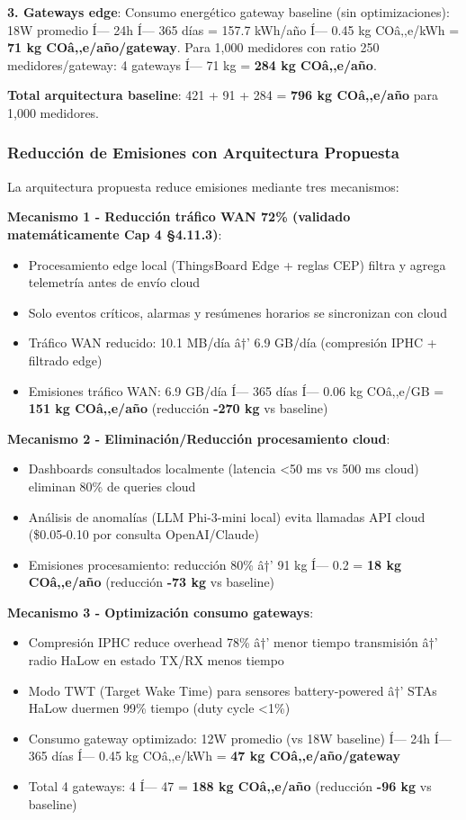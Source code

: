 \textbf{3. Gateways edge}: Consumo energético gateway baseline (sin optimizaciones): 18W promedio Í— 24h Í— 365 días = 157.7 kWh/año Í— 0.45 kg COâ‚‚e/kWh = \textbf{71 kg COâ‚‚e/año/gateway}. Para 1,000 medidores con ratio 250 medidores/gateway: 4 gateways Í— 71 kg = \textbf{284 kg COâ‚‚e/año}.

\textbf{Total arquitectura baseline}: 421 + 91 + 284 = \textbf{796 kg COâ‚‚e/año} para 1,000 medidores.

\subsubsection{Reducción de Emisiones con Arquitectura Propuesta}

La arquitectura propuesta reduce emisiones mediante tres mecanismos:

\textbf{Mecanismo 1 - Reducción tráfico WAN 72\% (validado matemáticamente Cap 4 §4.11.3)}:
\begin{itemize}
    \item Procesamiento edge local (ThingsBoard Edge + reglas CEP) filtra y agrega telemetría antes de envío cloud
    \item Solo eventos críticos, alarmas y resúmenes horarios se sincronizan con cloud
    \item Tráfico WAN reducido: 10.1 MB/día â†’ 6.9 GB/día (compresión IPHC + filtrado edge)
    \item Emisiones tráfico WAN: 6.9 GB/día Í— 365 días Í— 0.06 kg COâ‚‚e/GB = \textbf{151 kg COâ‚‚e/año} (reducción \textbf{-270 kg} vs baseline)
\end{itemize}

\textbf{Mecanismo 2 - Eliminación/Reducción procesamiento cloud}:
\begin{itemize}
    \item Dashboards consultados localmente (latencia <50 ms vs 500 ms cloud) eliminan 80\% de queries cloud
    \item Análisis de anomalías (LLM Phi-3-mini local) evita llamadas API cloud (\$0.05-0.10 por consulta OpenAI/Claude)
    \item Emisiones procesamiento: reducción 80\% â†’ 91 kg Í— 0.2 = \textbf{18 kg COâ‚‚e/año} (reducción \textbf{-73 kg} vs baseline)
\end{itemize}

\textbf{Mecanismo 3 - Optimización consumo gateways}:
\begin{itemize}
    \item Compresión IPHC reduce overhead 78\% â†’ menor tiempo transmisión â†’ radio HaLow en estado TX/RX menos tiempo
    \item Modo TWT (Target Wake Time) para sensores battery-powered â†’ STAs HaLow duermen 99\% tiempo (duty cycle <1\%)
    \item Consumo gateway optimizado: 12W promedio (vs 18W baseline) Í— 24h Í— 365 días Í— 0.45 kg COâ‚‚e/kWh = \textbf{47 kg COâ‚‚e/año/gateway}
    \item Total 4 gateways: 4 Í— 47 = \textbf{188 kg COâ‚‚e/año} (reducción \textbf{-96 kg} vs baseline)
\end{itemize}

